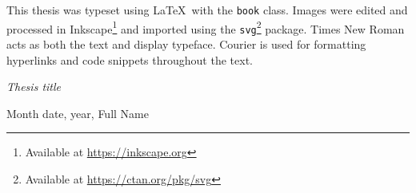 
\vspace*{\fill}
\thispagestyle{empty}
\colophontitlesize{10pt}
\colophontitle{ }
\colophon
This thesis was typeset using \LaTeX~with the \texttt{book} class. Images were edited and processed in Inkscape\footnote{Available at \url{https://inkscape.org}} and imported using the \texttt{svg}\footnote{Available at \url{https://ctan.org/pkg/svg}} package. Times New Roman acts as both the text and display typeface. Courier is used for formatting hyperlinks and code snippets throughout the text.

\vspace{0.4cm}

\textit{Thesis title}

\vspace{0.3cm}

Month date, year, Full Name\orcidA{}
\endcolophon